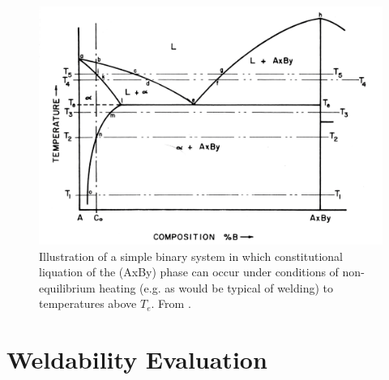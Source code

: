 \begin{figure}
    \includegraphics[width=6in]{figures/pepe-liquation-diagram.png}
    \caption{Illustration of a simple binary system in which constitutional liquation of the (AxBy) phase can occur under conditions of non-equilibrium heating (e.g. as would be typical of welding) to temperatures above $T_e$. From \citet{pepe_effects_1967}.}
    \label{pepe-liquation-diagram}
\end{figure}




\section{Weldability Evaluation} \label{sec:weldability-evaluation}

